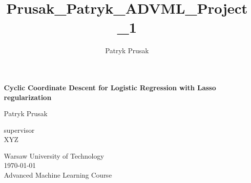\documentclass[12pt]{article}
\begin{document}

\title{Prusak_Patryk_ADVML_Project_1}
\author{\normalsize Patryk Prusak }
\hspace{0pt}
\vfill
\begin{center}

    \textbf{\huge{Cyclic Coordinate Descent for Logistic Regression with Lasso regularization}}
    
\end{center}

\vspace{0.5cm}
\begin{center}
    \normalsize{Patryk Prusak}
\end{center}
\vspace{0.5cm}
\begin{center}
    \normalsize{supervisor}\\
    \vspace{0.3cm}
    \normalsize{XYZ}
\end{center}

\vspace{0.5cm}

\begin{center} 
\normalsize{Warsaw University of Technology} \\
\vspace{0.3cm}
\normalsize{\today} \\
\vspace{0.3cm}
Advanced Machine Learning Course
\end{center}

\vspace{1cm}


\tableofcontents
\vfill
\hspace{0pt}
\newpage

\end{document}
